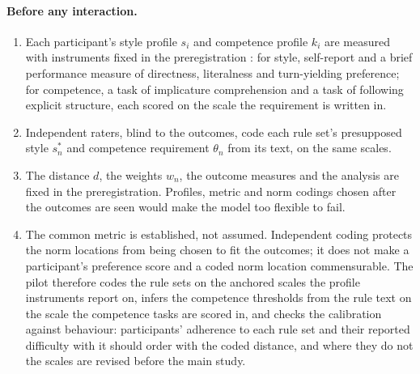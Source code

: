 \paragraph{Before any interaction.}
\begin{enumerate}[label=(\roman*), leftmargin=*]
\item Each participant's style profile $s_i$ and competence profile $k_i$ are measured with instruments fixed in the preregistration \cite{Nosek2018}: for style, self-report and a brief performance measure of directness, literalness and turn-yielding preference; for competence, a task of implicature comprehension and a task of following explicit structure, each scored on the scale the requirement is written in.
\item Independent raters, blind to the outcomes, code each rule set's presupposed style $s^{*}_n$ and competence requirement $\theta_n$ from its text, on the same scales.
\item The distance $d$, the weights $w_n$, the outcome measures and the analysis are fixed in the preregistration. Profiles, metric and norm codings chosen after the outcomes are seen would make the model too flexible to fail.
\item The common metric is established, not assumed. Independent coding protects the norm locations from being chosen to fit the outcomes; it does not make a participant's preference score and a coded norm location commensurable. The pilot therefore codes the rule sets on the anchored scales the profile instruments report on, infers the competence thresholds from the rule text on the scale the competence tasks are scored in, and checks the calibration against behaviour: participants' adherence to each rule set and their reported difficulty with it should order with the coded distance, and where they do not the scales are revised before the main study.
\end{enumerate}

